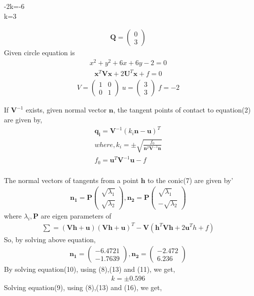 \documentclass[journal,10pt,twocolumn]{article}
\let\vec\mathbf
\newcommand{\myvec}[1]{\ensuremath{\begin{pmatrix}#1\end{pmatrix}}}
\begin{document}
\begin{center}
-2k=-6\\
k=3
\end{center}

\begin{eqnarray}
\vec{Q}=\myvec{0\\3}
\end{eqnarray}
Given circle equation is \begin{align}
x^2+y^2+6x+6y-2=0
\end{align}
\begin{align}
\vec{x}^T\vec{Vx}+2\vec{U}^T\vec{x}+f=0
\end{align}
\begin{eqnarray}
V=\myvec{1&0\\ 0 &1} \; u=\myvec{3\\3} \;  f=-2
\end{eqnarray}

\large{If $\vec{V}^{-1}$ exists, given normal vector $\vec{n}$, the tangent points of contact to equation(2) are given by,}
\begin{align}
\vec{q_i}=\vec{V}^{-1}(k_i\vec{n}-\vec{u})^T \\
where,k_i=\pm \sqrt{\frac{f_0}{\vec{n}^T\vec{V}^{-1}\vec{n}}}\\
f_0=\vec{u}^T\vec{V}^{-1}\vec{u}-f\\
\end{align}



The normal vectors of tangents from a point $\vec{h}$ to the conic(7) are given by'
   \begin{align}
   \vec{n_1}=\vec{P}\myvec{\sqrt{\lambda_1}\\ \sqrt{\lambda_2}},\vec{n_2}=\vec{P}\myvec{\sqrt{\lambda_1}\\ -\sqrt{\lambda_2}}
   \end{align}
where $\lambda_i,\vec{P}$ are eigen parameters of 
\begin{align}
\sum=(\vec{V}\vec{h}+\vec{u})(\vec{V}\vec{h}+\vec{u})^T-\vec{V}(\vec{h}^T\vec{V}\vec{h}+2\vec{u}^Th+f)
\end{align}
   So, by solving above equation,
   \begin{align}
   \vec{n_1}=\myvec{-6.4721\\-1.7639},\vec{n_2}=\myvec{-2.472\\6.236}
   \end{align} 
   By solving equation(10), using (8),(13) and (11), we get,
   \begin{align}
   k=\pm0.596
   \end{align}
   Solving equation(9), using (8),(13) and (16), we get,
   
\end{document}
